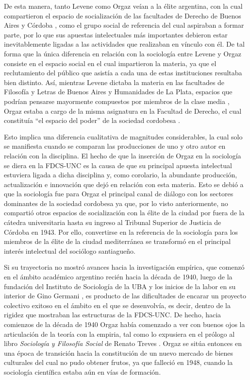 De esta manera, tanto Levene como Orgaz veían a la élite argentina, con la cual compartieron el espacio de socialización de las facultades de Derecho de Buenos Aires y Córdoba \parencite{277-AGUERO2017,1542-ORTIZ2012}, como el grupo social de referencia del cual aspiraban a formar parte, por lo que sus apuestas intelectuales más importantes debieron estar inevitablemente ligadas a las actividades que realizaban en vínculo con él. De tal forma que la única diferencia en relación con la sociología entre Levene y Orgaz consiste en el espacio social en el cual impartieron la materia, ya que el reclutamiento del público que asistía a cada una de estas instituciones resultaba bien distinto. Así, mientras Levene dictaba la materia en las facultades de Filosofía y Letras de Buenos Aires y Humanidades de La Plata, espacios que podrían pensarse mayormente compuestos por miembros de la clase media \parencite{1537-BUCHBINDER1997,1627-FINOCCHIO2001}, Orgaz estaba a cargo de la misma asignatura en la Facultad de Derecho, el cual constituía \enquote{el espacio del poder} de la sociedad cordobesa \parencite[39]{1447-CARACCIOLO2010}.

Esto implica una diferencia cualitativa de magnitudes considerables, la cual solo se manifiesta cuando se comparan las producciones de uno y otro autor en relación con la disciplina. El hecho de que la inserción de Orgaz en la sociología se diera en la FDCS-UNC es la causa de que su principal apuesta intelectual estuviera ligada a dicha disciplina y, como corolario, la abundante producción, actualización e innovación que dejó en relación con esta materia. Esto se debió a que la sociología fue para Orgaz el principal canal de diálogo con los sectores dominantes de la sociedad cordobesa ya que, por lo visto anteriormente, no compartió otros espacios de socialización con la élite de la ciudad por fuera de la cátedra universitaria hasta su ingreso al Tribunal Superior de Justicia de Córdoba en 1943. Por ello, convertirse en la referencia de la sociología para los miembros de la élite de la ciudad mediterránea se transformó en el principal interés intelectual del sociólogo santiagueño.

Si su trayectoria no mostró avances hacia la investigación empírica, que comenzó en el ámbito académico argentino recién hacia la década de 1940, luego de la fundación del Instituto de Sociología de la UBA y los inicios de la labor en su interior de Gino Germani \parencite{1670-GONZALEZBOLLO1999}, es producto de las dificultades de encarar un proyecto colectivo exitoso en el ámbito en el que se desenvolvía, es decir, dentro de la rigidez que mostraban las estructuras de la FDCS-UNC. De hecho, hacia comienzos de la década de 1940 Orgaz había comenzado a ver con buenos ojos la articulación de la teoría con la empiria, tal como lo expusiera en el prólogo al libro \emph{Sociología y Filosofía Social} de Renato Treves \parencite{1546-ORGAZ1941}. Orgaz se sitúa entonces en una época de transición hacia la constitución de un nuevo mercado de bienes culturales del cual no pudo obtener frutos, ya que falleció en 1948, cuando la sociología científica estaba aún en vías de formación.

